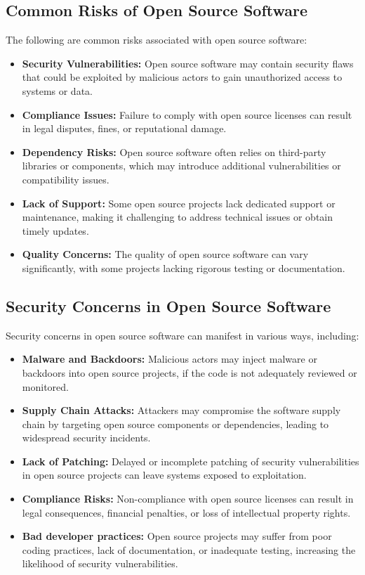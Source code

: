 \subsection{Common Risks of Open Source Software}

The following are common risks associated with open source software:
\begin{itemize}
    \item \textbf{Security Vulnerabilities:} Open source software may contain security flaws that could be exploited by malicious actors to gain unauthorized access to systems or data.
    \item \textbf{Compliance Issues:} Failure to comply with open source licenses can result in legal disputes, fines, or reputational damage.
    \item \textbf{Dependency Risks:} Open source software often relies on third-party libraries or components, which may introduce additional vulnerabilities or compatibility issues.
    \item \textbf{Lack of Support:} Some open source projects lack dedicated support or maintenance, making it challenging to address technical issues or obtain timely updates.
    \item \textbf{Quality Concerns:} The quality of open source software can vary significantly, with some projects lacking rigorous testing or documentation.
\end{itemize}

\cite{OpenSource-Software-Risks-Disadvantages}

\subsection{Security Concerns in Open Source Software}

Security concerns in open source software can manifest in various ways, including:
\begin{itemize}
    \item \textbf{Malware and Backdoors:} Malicious actors may inject malware or backdoors into open source projects, if the code is not adequately reviewed or monitored.
    \item \textbf{Supply Chain Attacks:} Attackers may compromise the software supply chain by targeting open source components or dependencies, leading to widespread security incidents.
    \item \textbf{Lack of Patching:} Delayed or incomplete patching of security vulnerabilities in open source projects can leave systems exposed to exploitation.
    \item \textbf{Compliance Risks:} Non-compliance with open source licenses can result in legal consequences, financial penalties, or loss of intellectual property rights.
    \item \textbf{Bad developer practices:} Open source projects may suffer from poor coding practices, lack of documentation, or inadequate testing, increasing the likelihood of security vulnerabilities.
\end{itemize}

